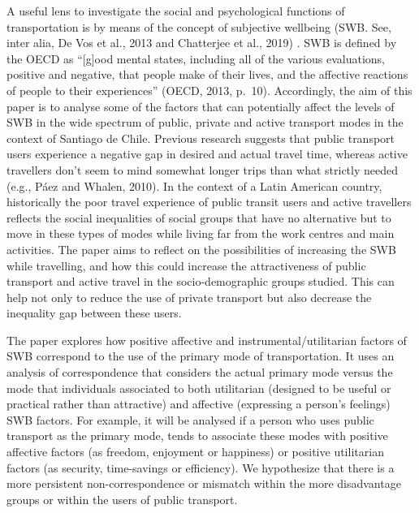 \documentclass[]{elsarticle} %
\begin{document}
A useful lens to investigate the social and psychological functions of
transportation is by means of the concept of subjective wellbeing (SWB.
See, inter alia, De Vos et al., 2013 and Chatterjee et al., 2019) . SWB
is defined by the OECD as ``{[}g{]}ood mental states, including all of
the various evaluations, positive and negative, that people make of
their lives, and the affective reactions of people to their
experiences'' (OECD, 2013, p.~10). Accordingly, the aim of this paper is
to analyse some of the factors that can potentially affect the levels of
SWB in the wide spectrum of public, private and active transport modes
in the context of Santiago de Chile. Previous research suggests that
public transport users experience a negative gap in desired and actual
travel time, whereas active travellers don't seem to mind somewhat
longer trips than what strictly needed (e.g., Páez and Whalen, 2010). In
the context of a Latin American country, historically the poor travel
experience of public transit users and active travellers reflects the
social inequalities of social groups that have no alternative but to
move in these types of modes while living far from the work centres and
main activities. The paper aims to reflect on the possibilities of
increasing the SWB while travelling, and how this could increase the
attractiveness of public transport and active travel in the
socio-demographic groups studied. This can help not only to reduce the
use of private transport but also decrease the inequality gap between
these users.

The paper explores how positive affective and instrumental/utilitarian
factors of SWB correspond to the use of the primary mode of
transportation. It uses an analysis of correspondence that considers the
actual primary mode versus the mode that individuals associated to both
utilitarian (designed to be useful or practical rather than attractive)
and affective (expressing a person's feelings) SWB factors. For example,
it will be analysed if a person who uses public transport as the primary
mode, tends to associate these modes with positive affective factors (as
freedom, enjoyment or happiness) or positive utilitarian factors (as
security, time-savings or efficiency). We hypothesize that there is a
more persistent non-correspondence or mismatch within the more
disadvantage groups or within the users of public transport.
\end{document}
